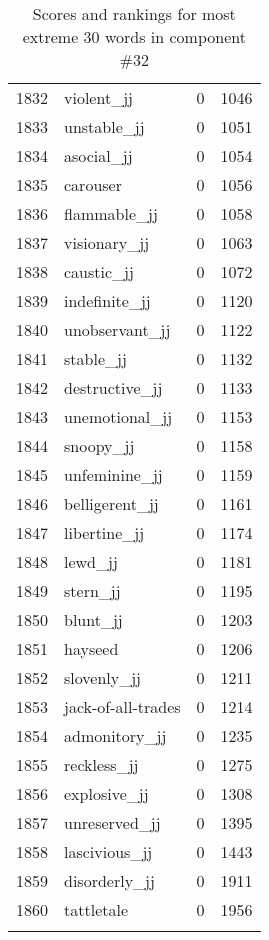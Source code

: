 \begin{longtable}[!htbp]{| rlr@{.}l |}
    1832 & violent\_jj & 0 & 1046 \\
    1833 & unstable\_jj & 0 & 1051 \\
    1834 & asocial\_jj & 0 & 1054 \\
    1835 & carouser & 0 & 1056 \\
    1836 & flammable\_jj & 0 & 1058 \\
    1837 & visionary\_jj & 0 & 1063 \\
    1838 & caustic\_jj & 0 & 1072 \\
    1839 & indefinite\_jj & 0 & 1120 \\
    1840 & unobservant\_jj & 0 & 1122 \\
    1841 & stable\_jj & 0 & 1132 \\
    1842 & destructive\_jj & 0 & 1133 \\
    1843 & unemotional\_jj & 0 & 1153 \\
    1844 & snoopy\_jj & 0 & 1158 \\
    1845 & unfeminine\_jj & 0 & 1159 \\
    1846 & belligerent\_jj & 0 & 1161 \\
    1847 & libertine\_jj & 0 & 1174 \\
    1848 & lewd\_jj & 0 & 1181 \\
    1849 & stern\_jj & 0 & 1195 \\
    1850 & blunt\_jj & 0 & 1203 \\
    1851 & hayseed & 0 & 1206 \\
    1852 & slovenly\_jj & 0 & 1211 \\
    1853 & jack-of-all-trades & 0 & 1214 \\
    1854 & admonitory\_jj & 0 & 1235 \\
    1855 & reckless\_jj & 0 & 1275 \\
    1856 & explosive\_jj & 0 & 1308 \\
    1857 & unreserved\_jj & 0 & 1395 \\
    1858 & lascivious\_jj & 0 & 1443 \\
    1859 & disorderly\_jj & 0 & 1911 \\
    1860 & tattletale & 0 & 1956 \\
    \hline
    \caption{Scores and rankings for most extreme 30 words in component \#32} \\
\end{longtable}

